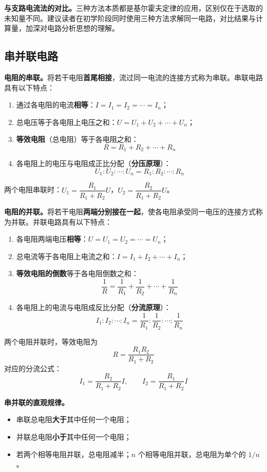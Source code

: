 \documentclass[12pt,UTF8]{ctexbook}
\begin{document}
\textbf{与支路电流法的对比。}三种方法本质都是基尔霍夫定律的应用，区别仅在于选取的未知量不同。建议读者在初学阶段同时使用三种方法求解同一电路，对比结果与计算量，加深对电路分析思想的理解。

\subsection{串并联电路}

\textbf{电阻的串联。}将若干电阻\textbf{首尾相接}，流过同一电流的连接方式称为串联。串联电路具有以下特点：
\begin{enumerate}
  \item 通过各电阻的电流\textbf{相等}：$I = I_1 = I_2 = \cdots = I_n$；
  \item 总电压等于各电阻上电压之和：$U = U_1 + U_2 + \cdots + U_n$；
  \item \textbf{等效电阻}（总电阻）等于各电阻之和：
  \[
  R = R_1 + R_2 + \cdots + R_n
  \]
  \item 各电阻上的电压与电阻成正比分配（\textbf{分压原理}）：
  \[
  U_1 : U_2 : \cdots : U_n = R_1 : R_2 : \cdots : R_n
  \]
\end{enumerate}
两个电阻串联时：$U_1 = \dfrac{R_1}{R_1 + R_2} U$，$U_2 = \dfrac{R_2}{R_1 + R_2} U$。

\textbf{电阻的并联。}将若干电阻\textbf{两端分别接在一起}，使各电阻承受同一电压的连接方式称为并联。并联电路具有以下特点：
\begin{enumerate}
  \item 各电阻两端电压\textbf{相等}：$U = U_1 = U_2 = \cdots = U_n$；
  \item 总电流等于各电阻上电流之和：$I = I_1 + I_2 + \cdots + I_n$；
  \item \textbf{等效电阻的倒数}等于各电阻倒数之和：
  \[
  \frac{1}{R} = \frac{1}{R_1} + \frac{1}{R_2} + \cdots + \frac{1}{R_n}
  \]
  \item 各电阻上的电流与电阻成反比分配（\textbf{分流原理}）：
  \[
  I_1 : I_2 : \cdots : I_n = \frac{1}{R_1} : \frac{1}{R_2} : \cdots : \frac{1}{R_n}
  \]
\end{enumerate}
两个电阻并联时，等效电阻为
\[
R = \frac{R_1 R_2}{R_1 + R_2}
\]
对应的分流公式：
\[
I_1 = \frac{R_2}{R_1 + R_2} I, \qquad I_2 = \frac{R_1}{R_1 + R_2} I
\]

\textbf{串并联的直观规律。}
\begin{itemize}
  \item 串联总电阻\textbf{大于}其中任何一个电阻；
  \item 并联总电阻\textbf{小于}其中任何一个电阻；
  \item 若两个相等电阻并联，总电阻减半；$n$ 个相等电阻并联，总电阻为单个的 $1/n$。
\end{itemize}
\end{document}
